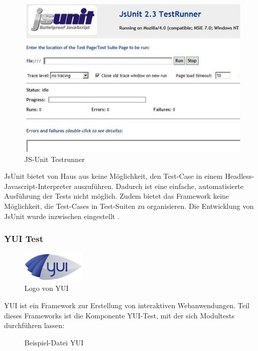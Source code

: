 \begin{figure}[H]
	\begin{center}
		\includegraphics[width=12cm]{bilder/jsunit-testrunner}
		\caption{JS-Unit Testrunner}
		\label{image:jsunit-testrunner}
	\end{center}
\end{figure}

JsUnit bietet von Haus aus keine Möglichkeit, den Test-Case in einem Headless- Javascript-Interpreter auszuführen. Dadurch ist eine einfache, automatisierte Ausführung der Tests nicht möglich. Zudem bietet das Framework keine Möglichkeit, die Test-Cases in Test-Suiten zu organisieren. Die Entwicklung von JsUnit wurde inzwischen eingestellt \citep[Vgl.][]{Pivotal12}.

\subsubsection{YUI Test}

\begin{figure}[H]
	\begin{center}
	\includegraphics[width=3cm]{bilder/yui}
		\caption{Logo von YUI}
		\label{image:yui}
	\end{center}
\end{figure}

YUI ist ein Framework zur Erstellung von interaktiven Webanwendungen. Teil dieses Frameworks ist die Komponente YUI-Test, mit der sich Modultests durchführen lassen:

\begin{figure}[H]
	\caption{Beispiel-Datei YUI}
	\label{code:yui}
\end{figure}

